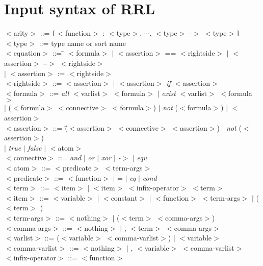 \chapter{Input syntax of RRL}
\small
\begin{tabbing}
 $<$arity$>$ ::= {\tt [}$<$function$>$ : $<$type$>$, $\cdots$, $<$type$>$ -$>$ 
$<$type$>${\tt ]} \\
 $<$type$>$ ::= type name or sort name \\
 $<$equation$>$ ::= \= $<$formula$>$ $|$ $<$assertion$>$ == $<$rightside$>$ 
		     $|$ $<$assertion$>$ {\em {\tt ---}$>$} $<$rightside$>$\\
                    \> $|$ $<$assertion$>$ := $<$rightside$>$ \\
 $<$rightside$>$ ::= $<$assertion$>$ $|$ $<$assertion$>$ {\em if} $<$assertion$>$\\
 $<$formula$>$ ::= \=     {\em all} $<$varlist$>$ $<$formula$>$
                      $|$ {\em exist} $<$varlist$>$ $<$formula$>$ \\
\>	   	      $|$ ($<$formula$>$ $<$connective$>$ $<$formula$>$) 
		      $|$ {\em not} ($<$formula$>$) $|$ $<$assertion$>$ \\
 $<$assertion$>$ ::= \= ($<$assertion$>$ $<$connective$>$ $<$assertion$>$)
                      $|$ {\em not} ($<$assertion$>$) \\
 \>                   $|$ {\em true} $|$ {\em false}
                      $|$ $<$atom$>$\\
 $<$connective$>$ ::= {\em and} $|$ {\em or} $|$ {\em xor} $|$ {\em -$>$} $|$ {\em equ} \\
 $<$atom$>$ ::= $<$predicate$>$ $<$term-args$>$ \\
 $<$predicate$>$ ::= $<$function$>$ $|$ = $|$ {\em eq} $|$ {\em cond} \\
 $<$term$>$ ::= $<$item$>$ $|$ $<$item$>$ $<$infix-operator$>$ $<$term$>$\\
 $<$item$>$ ::= $<$variable$>$ $|$ $<$constant$>$ 
		$|$ $<$function$>$ $<$term-args$>$ $|$ ( $<$term$>$ )\\
 $<$term-args$>$ ::= $<$nothing$>$ $|$ ($<$term$>$ $<$comma-args$>$)\\
 $<$comma-args$>$ ::= $<$nothing$>$ $|$ , $<$term$>$ $<$comma-args$>$\\
 $<$varlist$>$ ::= ($<$variable$>$ $<$comma-varlist$>$) $|$ $<$variable$>$\\
 $<$comma-varlist$>$ ::= $<$nothing$>$ $|$ , $<$variable$>$ $<$comma-varlist$>$\\
 $<$infix-operator$>$ ::= $<$function$>$\\

\end{tabbing}
